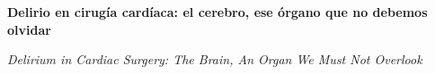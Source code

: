 
\renewcommand{\articuloidiomaxml}{es}
\renewcommand{\articulotitulo}{Delirio en cirugía cardíaca: el cerebro, ese órgano que no debemos olvidar}
\renewcommand{\articuloautores}{Julio Giorgini}
\renewcommand{\articulodoi}{10.7775/rac.es.v93.i6.20963}
\renewcommand{\articulotipo}{EDITORIAL}
\renewcommand{\articulorevista}{Revista Argentina de Cardiología}
\renewcommand{\articuloissne}{0034-7000}
\renewcommand{\articulovolumen}{93}
\renewcommand{\articulonumero}{6}
\renewcommand{\articulofecha}{DICIEMBRE 2025}
\renewcommand{\articulopagina}{415}

\setcounter{page}{415}
\thispagestyle{firstpage}

\noindent\begin{minipage}[t]{\dimexpr\textwidth+\marginparsep+\marginparwidth\relax}%
{\sffamily\bfseries\Large\articulotitulo\par}%
\end{minipage}\par
\vspace{3mm}%
\renewcommand{\articulotitulotrans}{Delirium in Cardiac Surgery: The Brain, An Organ We Must Not Overlook}
\noindent\begin{minipage}[t]{\dimexpr\textwidth+\marginparsep+\marginparwidth\relax}%
{\sffamily\itshape\normalsize\articulotitulotrans\par}%
\end{minipage}\par
\vspace{4mm}%

